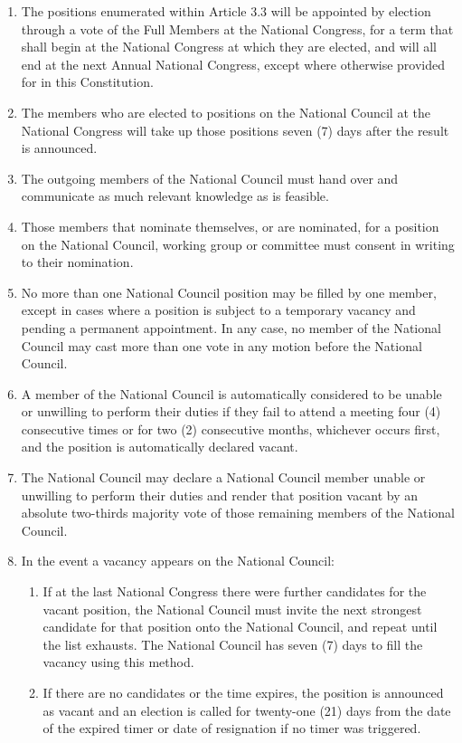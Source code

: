 \documentclass[a4paper,titlepage,8.5pt]{article}
\begin{document}
\begin{enumerate}
\item The positions enumerated within Article 3.3 will be appointed by election through a vote of the Full Members at the National Congress, for a term that shall begin at the National Congress at which they are elected, and will all end at the next Annual National Congress, except where otherwise provided for in this Constitution.
\item The members who are elected to positions on the National Council at the National Congress will take up those positions seven (7) days after the result is announced.
\item The outgoing members of the National Council must hand over and communicate as much relevant knowledge as is feasible.
\item Those members that nominate themselves, or are nominated, for a position on the National Council, working group or committee must consent in writing to their nomination.
\item No more than one National Council position may be filled by one member, except in cases where a position is subject to a temporary vacancy and pending a permanent appointment. In any case, no member of the National Council may cast more than one vote in any motion before the National Council.
\item A member of the National Council is automatically considered to be unable or unwilling to perform their duties if they fail to attend a meeting four (4) consecutive times or for two (2) consecutive months, whichever occurs first, and the position is automatically declared vacant.
\item The National Council may declare a National Council member unable or unwilling to perform their duties and render that position vacant by an absolute two-thirds majority vote of those remaining members of the National Council.
\item In the event a vacancy appears on the National Council:
\begin{enumerate}
    \item If at the last National Congress there were further candidates for the vacant position, the National Council must invite the next strongest candidate for that position onto the National Council, and repeat until the list exhausts. The National Council has seven (7) days to fill the vacancy using this method.
    \item If there are no candidates or the time expires, the position is announced as vacant and an election is called for twenty-one (21) days from the date of the expired timer or date of resignation if no timer was triggered.

\end{enumerate}
\end{enumerate}
\end{document}
